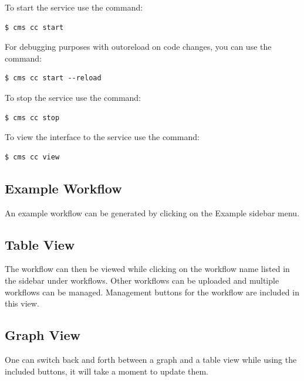 To start the service use the command:

\begin{verbatim}
$ cms cc start
\end{verbatim}
\smallskip

For debugging purposes with outoreload on code changes, you can use the
command:

\begin{verbatim}
$ cms cc start --reload
\end{verbatim}
\smallskip

To stop the service use the command:

\begin{verbatim}
$ cms cc stop
\end{verbatim}
\smallskip

To view the interface to the service use the command:

\begin{verbatim}
$ cms cc view
\end{verbatim}
\smallskip

\subsection{Example Workflow}\label{example-workflow}

An example workflow can be generated by clicking on the Example
sidebar menu.

\subsection{Table View}\label{table-view}

The workflow can then be viewed while clicking on the workflow name
listed in the sidebar under workflows. Other workflows can be uploaded
and multiple workflows can be managed. Management buttons for the
workflow are included in this view.


\subsection{Graph View}\label{graph-view}

One can switch back and forth between a graph and a table view while
using the included buttons, it will take a moment to update them.

